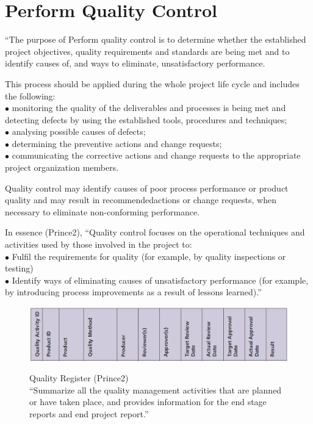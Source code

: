 \documentclass[]{project_plan}
\newcommand{\bulletPoint}{\hspace{-3.1pt}$\bullet$ \hspace{5pt}}
\begin{document}
\newpage

\section{Perform Quality Control}

“The purpose of Perform quality control is to determine whether the established project objectives, quality
requirements and standards are being met and to identify causes of, and ways to eliminate, unsatisfactory
performance.

This process should be applied during the whole project life cycle and includes the following:\\
\bulletPoint monitoring the quality of the deliverables and processes is being met and detecting defects by using the
established tools, procedures and techniques;\\
\bulletPoint analysing possible causes of defects;\\
\bulletPoint determining the preventive actions and change requests;\\
\bulletPoint communicating the corrective actions and change requests to the appropriate project organization members.

Quality control may identify causes of poor process performance or product quality and may result in
recommendedactions or change requests, when necessary to eliminate non-conforming performance.

In essence (Prince2), “Quality control focuses on the operational techniques and activities used by those involved
in the project to:\\
\bulletPoint Fulfil the requirements for quality (for example, by quality inspections or testing)\\
\bulletPoint Identify ways of eliminating causes of unsatisfactory performance (for example, by introducing process
improvements as a result of lessons learned).”

\begin{figure}[H]
  \centering
  \includegraphics[width=\linewidth]{quality_reg.png}

  Quality Register (Prince2)\\
  “Summarize all the quality management activities that are planned or have taken place, and provides
  information for the end stage reports and end project report.”
\end{figure}
\end{document}
